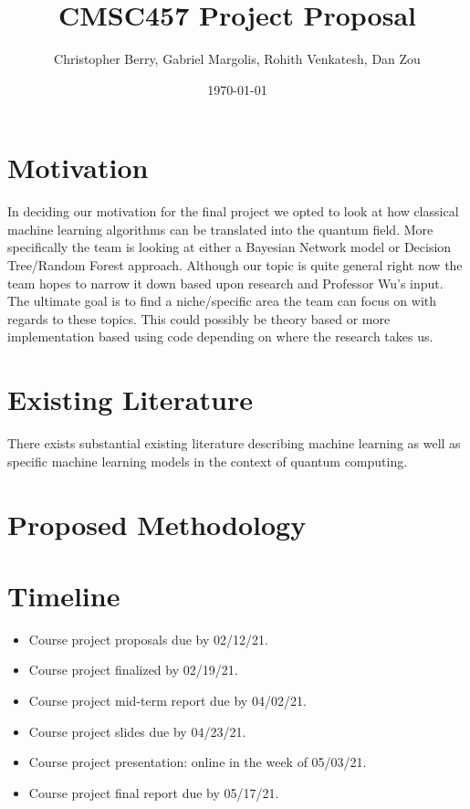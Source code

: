 \documentclass[letter,draft]{article}
\title{CMSC457 Project Proposal}
\author{Christopher Berry, Gabriel Margolis, Rohith Venkatesh, Dan Zou}
\date{\today}
\begin{document}
\maketitle

\section{Motivation}
In deciding our motivation for the final project we opted to look at how
classical machine learning algorithms can be translated into the quantum field. 
More specifically the team is looking at either a Bayesian Network model or
Decision Tree/Random Forest approach. Although our topic is quite general right 
now the team hopes to narrow it down based upon research and Professor Wu’s
input. The ultimate goal is to find a niche/specific area the team can focus 
on with regards to these topics. This could possibly be theory based or more 
implementation based using code depending on where the research takes us. 

\section{Existing Literature}

There exists substantial existing literature describing machine learning
as well as specific machine learning models in the context of quantum
computing.

\section{Proposed Methodology}


\section{Timeline}

\begin{itemize}
  \item Course project proposals due by 02/12/21.
  \item Course project finalized by 02/19/21.
  \item Course project mid-term report due by 04/02/21.
  \item Course project slides due by 04/23/21.
  \item Course project presentation: online in the week of 05/03/21.
  \item Course project final report due by 05/17/21.
\end{itemize}

\printbibliography[heading=bibnumbered]
\end{document}
